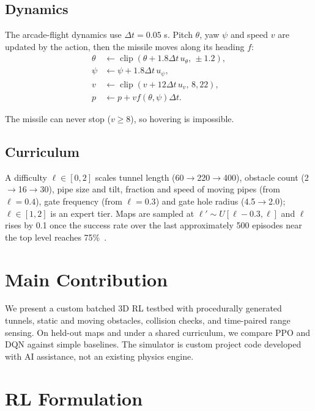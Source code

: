 \documentclass[10pt,a4paper,twocolumn]{article}
\begin{document}
\subsection*{Dynamics}

The arcade-flight dynamics use $\Delta t=0.05$ s. Pitch
$\theta$, yaw $\psi$ and speed $v$ are updated by the action,
then the missile moves along its heading $f$:
\begin{align}
  \theta &\leftarrow
  \operatorname{clip}(\theta+1.8\Delta t\,u_\theta,\,\pm1.2),\\
  \psi &\leftarrow \psi+1.8\Delta t\,u_\psi,\\
  v &\leftarrow \operatorname{clip}(v+12\Delta t\,u_v,\,8,22),\\
  p &\leftarrow p+v f(\theta,\psi)\Delta t.
\end{align}

The missile can never stop ($v\geq 8$), so hovering is impossible.

\subsection*{Curriculum}

A difficulty $\ell\in[0,2]$ scales tunnel length
(60$\to$220$\to$400), obstacle count (2$\to$16$\to$30),
pipe size and tilt, fraction and speed of moving pipes
(from $\ell=0.4$), gate frequency (from $\ell=0.3$) and gate
hole radius (4.5$\to$2.0); $\ell\in[1,2]$ is an expert tier.
Maps are sampled at $\ell'\sim U[\ell-0.3,\ell]$ and $\ell$
rises by 0.1 once the success rate over the last approximately
500 episodes near the top level reaches 75\%~\cite{bengio2009}.

\section*{Main Contribution}

We present a custom batched 3D RL testbed with procedurally
generated tunnels, static and moving obstacles, collision checks,
and time-paired range sensing. On held-out maps and under a
shared curriculum, we compare PPO and DQN against simple
baselines. The simulator is custom project code developed with
AI assistance, not an existing physics engine.

\section{RL Formulation}
\end{document}
